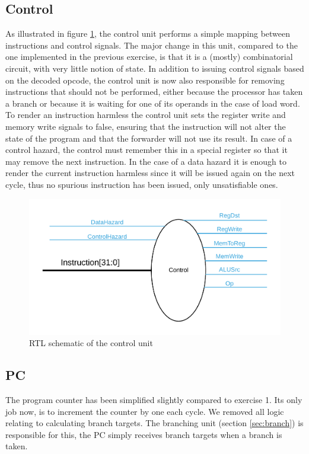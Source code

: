 \subsection{Control}
As illustrated in figure \ref{fig:control}, the control unit performs a simple mapping between instructions and control signals.
The major change in this unit, compared to the one implemented in the previous exercise, is that it is a (mostly) combinatorial circuit, with very little notion of state.
In addition to issuing control signals based on the decoded opcode, the control unit is now also responsible for removing instructions that should not be performed, either because the processor has taken a branch or because it is waiting for one of its operands in the case of load word.
To render an instruction harmless the control unit sets the register write and memory write signals to false, ensuring that the instruction will not alter the state of the program and that the forwarder will not use its result.
In case of a control hazard, the control must remember this in a special register so that it may remove the next instruction. 
In the case of a data hazard it is enough to render the current instruction harmless since it will be issued again on the next cycle, thus no spurious instruction has been issued, only unsatisfiable ones.

\begin{figure}[h!]
    \includegraphics[width=\linewidth]{img/Control.png}
    \caption{RTL schematic of the control unit}
    \label{fig:control}
\end{figure}

\subsection{PC}

The program counter has been simplified slightly compared to exercise 1.
Its only job now, is to increment the counter by one each cycle.
We removed all logic relating to calculating branch targets.
The branching unit (section \ref{sec:branch}) is responsible for this, the PC simply receives branch targets when a branch is taken.

